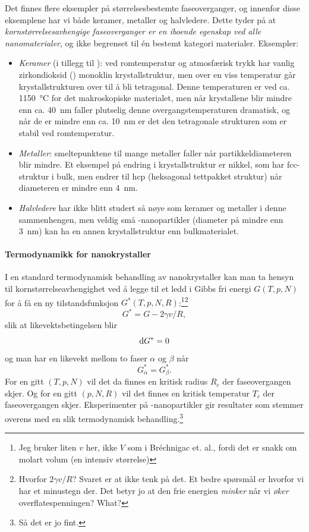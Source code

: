 Det finnes flere eksempler på størrelsesbestemte faseoverganger, og innenfor disse eksemplene har vi både keramer, metaller og halvledere. Dette tyder på at \emph{kornstørrelsesavhengige faseoverganger er en iboende egenskap ved alle nanomaterialer}, og ikke begrenset til én bestemt kategori materialer. Eksempler:
\begin{itemize}
	\item \emph{Keramer} (i tillegg til ): ved romtemperatur og atmosfærisk trykk har vanlig zirkondioksid () monoklin krystallstruktur, men over en viss temperatur går krystallstrukturen over til å bli tetragonal. Denne temperaturen er ved ca. \SI{1150}{\celsius} for det makroskopiske materialet, men når krystallene blir mindre enn ca. \SI{40}{\nano\meter} faller plutselig denne overgangstemperaturen dramatisk, og når de er mindre enn ca. \SI{10}{\nano\meter} er det den tetragonale strukturen som er stabil ved romtemperatur.
	\item \emph{Metaller}: smeltepunktene til mange metaller faller når partikkeldiameteren blir mindre. Et eksempel på endring i krystallstruktur er nikkel, som har fcc-struktur i bulk, men endrer til hcp (heksagonal tettpakket struktur) når diameteren er mindre enn \SI{4}{\nano\meter}.
	\item \emph{Halvledere} har ikke blitt studert så nøye som keramer og metaller i denne sammenhengen, men veldig små -nanopartikler (diameter på mindre enn \SI{3}{\nano\meter}) kan ha en annen krystallstruktur enn bulkmaterialet.
\end{itemize}

\paragraph{Termodynamikk for nanokrystaller} I en standard termodynamisk behandling av nanokrystaller kan man ta hensyn til kornstørrelseavhengighet ved å legge til et ledd i Gibbs fri energi $G(T,p,N)$ for å få en ny tilstandsfunksjon $G^*(T,p,N,R)$:\footnote{Jeg bruker liten $v$ her, ikke $V$ som i Bréchnigac et. al., fordi det er snakk om molart volum (en intensiv størrelse)}\footnote{Hvorfor $2\gamma v/R$? Svaret er at ikke tenk på det. Et bedre spørsmål er hvorfor vi har et minustegn der. Det betyr jo at den frie energien \emph{minker} når vi \emph{øker} overflatespenningen? What?}
\begin{equation}
	\label{eq:modified_gibbs}
	G^* = G - 2\gamma v / R,
\end{equation}
slik at likevektsbetingelsen blir
\begin{equation}
	\text{d}G^* = 0
\end{equation}
og man har en likevekt mellom to faser $\alpha$ og $\beta$ når
\begin{equation}
	G_{\alpha}^*=G_{\beta}^*.
\end{equation}
For en gitt $(T,p,N)$ vil det da finnes en kritisk radius $R_c$ der faseovergangen skjer. Og for en gitt $(p,N,R)$ vil det finnes en kritisk temperatur $T_c$ der faseovergangen skjer. Eksperimenter på -nanopartikler gir resultater som stemmer overens med en slik termodynamisk behandling.\footnote{Så det er jo fint.}

